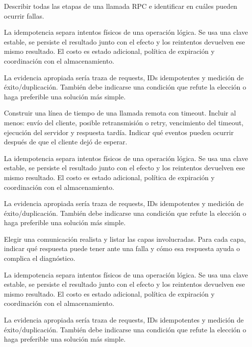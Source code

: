 \documentclass[variant=guia,cover=institutional,mode=screen]{ua-engineering-v6-article}
\begin{document}
\begin{uaexercise}
Describir todas las etapas de una llamada RPC e identificar en cuáles pueden ocurrir fallas.
\end{uaexercise}
\begin{uaanswer}
La idempotencia separa intentos físicos de una operación lógica. Se usa una clave estable, se persiste el resultado junto con el efecto y los reintentos devuelven ese mismo resultado. El costo es estado adicional, política de expiración y coordinación con el almacenamiento.

La evidencia apropiada sería traza de requests, IDs idempotentes y medición de éxito/duplicación. También debe indicarse una condición que refute la elección o haga preferible una solución más simple.
\end{uaanswer}

\begin{uaexercise}
Construir una línea de tiempo de una llamada remota con timeout. Incluir al menos: envío del cliente, posible retransmisión o retry, vencimiento del timeout, ejecución del servidor y respuesta tardía. Indicar qué eventos pueden ocurrir después de que el cliente dejó de esperar.
\end{uaexercise}
\begin{uaanswer}
La idempotencia separa intentos físicos de una operación lógica. Se usa una clave estable, se persiste el resultado junto con el efecto y los reintentos devuelven ese mismo resultado. El costo es estado adicional, política de expiración y coordinación con el almacenamiento.

La evidencia apropiada sería traza de requests, IDs idempotentes y medición de éxito/duplicación. También debe indicarse una condición que refute la elección o haga preferible una solución más simple.
\end{uaanswer}

\begin{uaexercise}
Elegir una comunicación realista y listar las capas involucradas. Para cada capa, indicar qué respuesta puede tener ante una falla y cómo esa respuesta ayuda o complica el diagnóstico.
\end{uaexercise}
\begin{uaanswer}
La idempotencia separa intentos físicos de una operación lógica. Se usa una clave estable, se persiste el resultado junto con el efecto y los reintentos devuelven ese mismo resultado. El costo es estado adicional, política de expiración y coordinación con el almacenamiento.

La evidencia apropiada sería traza de requests, IDs idempotentes y medición de éxito/duplicación. También debe indicarse una condición que refute la elección o haga preferible una solución más simple.
\end{uaanswer}
\end{document}

